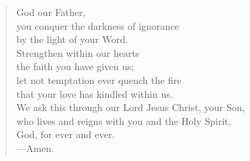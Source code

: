 \prayer

\setlength{\leftmargini}{\prayerleftmargini}

\begin{verse}
God our Father,\\
you conquer the darkness of ignorance\\
by the light of your Word.\\
Strengthen within our hearts\\
the faith you have given us;\\
let not temptation ever quench the fire\\
that your love has kindled within us.\\
We ask this through our Lord Jesus Christ, your Son,\\
who lives and reigns with you and the Holy Spirit,\\
God, for ever and ever.\\
{\color{red}---\thinspace}Amen.
\end{verse}

\setlength{\leftmargini}{\defleftmargini}